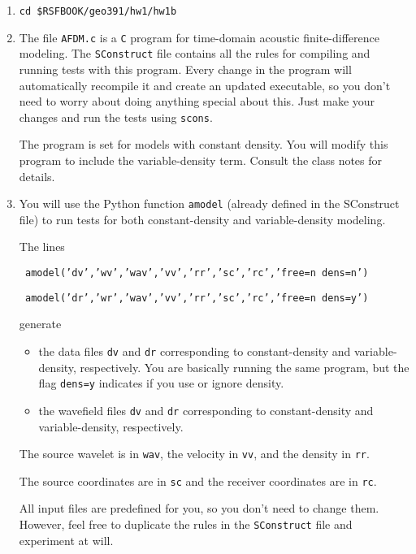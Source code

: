 \begin{enumerate}

\item \texttt{cd \$RSFBOOK/geo391/hw1/hw1b}

\item The file \texttt{AFDM.c} is a \texttt{C} program
for time-domain acoustic finite-difference modeling.
The \texttt{SConstruct} file contains all the rules for compiling and
running tests with this program. Every change in the program will
automatically recompile it and create an updated executable,
so you don't need to worry about doing anything special about this.
Just make your changes and run the tests using \texttt{scons}.

The program is set for models with constant density.
You will modify this program to include the variable-density term.
Consult the class notes for details.

\item
You will use the Python function \texttt{amodel} (already
defined in the SConstruct file) to run tests for both constant-density
and variable-density modeling.

The lines
\par
\texttt{ amodel('dv','wv','wav','vv','rr','sc','rc','free=n dens=n') }
\par
\texttt{ amodel('dr','wr','wav','vv','rr','sc','rc','free=n dens=y') }
\par
generate
\begin{itemize}
\item the data files \texttt{dv} and \texttt{dr} 
corresponding to constant-density
and variable-density, respectively. 
You are basically running the same program, but the flag
\texttt{dens=y} indicates if you use or ignore density.

\item the wavefield files \texttt{dv} and \texttt{dr} 
corresponding to constant-density
and variable-density, respectively. 
\end{itemize}

The source wavelet is in \texttt{wav},
the velocity in \texttt{vv}, and
the density  in \texttt{rr}. 

The   source coordinates are in \texttt{sc} and
the receiver coordinates are in \texttt{rc}.

All input files are predefined for you, so you don't need to change them.
However, feel free to duplicate the rules in the \texttt{SConstruct} 
file and experiment at will.


\end{enumerate}
